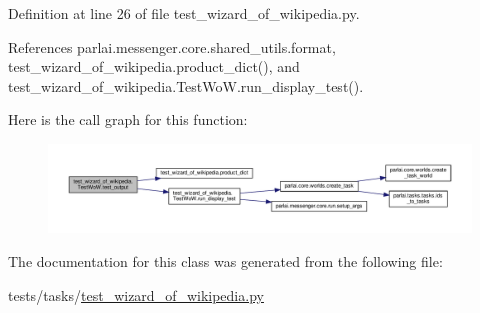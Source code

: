 Definition at line 26 of file test\+\_\+wizard\+\_\+of\+\_\+wikipedia.\+py.



References parlai.\+messenger.\+core.\+shared\+\_\+utils.\+format, test\+\_\+wizard\+\_\+of\+\_\+wikipedia.\+product\+\_\+dict(), and test\+\_\+wizard\+\_\+of\+\_\+wikipedia.\+Test\+Wo\+W.\+run\+\_\+display\+\_\+test().

Here is the call graph for this function\+:
\nopagebreak
\begin{figure}[H]
\begin{center}
\leavevmode
\includegraphics[width=350pt]{classtest__wizard__of__wikipedia_1_1TestWoW_a5a2ccfeb297d1fa8b356bcb9c4ce2225_cgraph}
\end{center}
\end{figure}


The documentation for this class was generated from the following file\+:\begin{DoxyCompactItemize}
\item 
tests/tasks/\hyperlink{test__wizard__of__wikipedia_8py}{test\+\_\+wizard\+\_\+of\+\_\+wikipedia.\+py}\end{DoxyCompactItemize}

